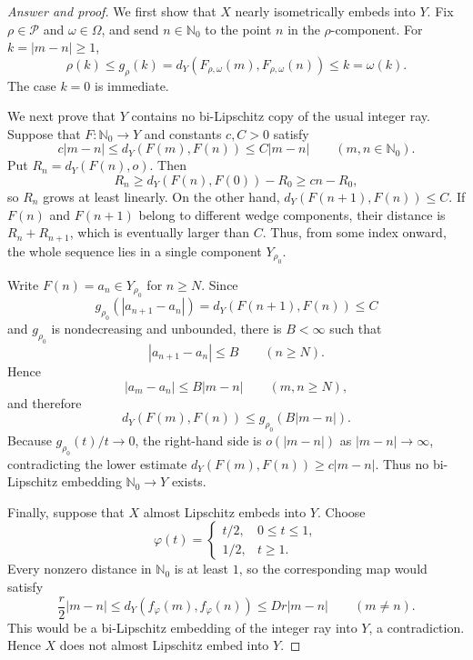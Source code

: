 \documentclass[11pt,reqno]{amsart}
\theoremstyle{plain}
\theoremstyle{definition}
\begin{document}
\begin{proof}[Answer and proof]
We first show that $X$ nearly isometrically embeds into $Y$. Fix $\rho\in\mathcal P$ and $\omega\in\Omega$, and send $n\in\mathbb N_0$ to the point $n$ in the $\rho$-component. For $k=|m-n|\geq1$,
\begin{equation*}
 \rho(k) \leq g_\rho(k) =d_Y(F_{\rho,\omega}(m),F_{\rho,\omega}(n)) \leq k =\omega(k).
\end{equation*}
The case $k=0$ is immediate.

We next prove that $Y$ contains no bi-Lipschitz copy of the usual integer ray. Suppose that $F\colon\mathbb N_0\to Y$ and constants $c,C>0$ satisfy
\begin{equation*}
 c|m-n|\leq d_Y(F(m),F(n))\leq C|m-n|
 \qquad(m,n\in\mathbb N_0).
\end{equation*}
Put $R_n=d_Y(F(n),o)$. Then
\begin{equation*}
 R_n\geq d_Y(F(n),F(0))-R_0\geq cn-R_0,
\end{equation*}
so $R_n$ grows at least linearly. On the other hand, $d_Y(F(n+1),F(n))\leq C$. If $F(n)$ and $F(n+1)$ belong to different wedge components, their distance is $R_n+R_{n+1}$, which is eventually larger than $C$. Thus, from some index onward, the whole sequence lies in a single component $Y_{\rho_0}$.

Write $F(n)=a_n\in Y_{\rho_0}$ for $n\geq N$. Since
\begin{equation*}
 g_{\rho_0}(|a_{n+1}-a_n|)=d_Y(F(n+1),F(n))\leq C
\end{equation*}
and $g_{\rho_0}$ is nondecreasing and unbounded, there is $B<\infty$ such that
\begin{equation*}
 |a_{n+1}-a_n|\leq B \qquad(n\geq N).
\end{equation*}
Hence
\begin{equation*}
 |a_m-a_n|\leq B|m-n| \qquad(m,n\geq N),
\end{equation*}
and therefore
\begin{equation*}
 d_Y(F(m),F(n))\leq g_{\rho_0}(B|m-n|).
\end{equation*}
Because $g_{\rho_0}(t)/t\to0$, the right-hand side is $o(|m-n|)$ as $|m-n|\to\infty$, contradicting the lower estimate $d_Y(F(m),F(n))\geq c|m-n|$. Thus no bi-Lipschitz embedding $\mathbb N_0\to Y$ exists.

Finally, suppose that $X$ almost Lipschitz embeds into $Y$. Choose
\begin{equation*}
 \varphi(t)=
 \begin{cases}
 t/2, & 0\leq t\leq1,\\
 1/2, & t\geq1.
 \end{cases}
\end{equation*}
Every nonzero distance in $\mathbb N_0$ is at least $1$, so the corresponding map would satisfy
\begin{equation*}
    \frac r2|m-n| \leq d_Y(f_\varphi(m),f_\varphi(n)) \leq Dr|m-n| \qquad(m\neq n).
\end{equation*}
This would be a bi-Lipschitz embedding of the integer ray into $Y$, a contradiction. Hence $X$ does not almost Lipschitz embed into $Y$.
\end{proof}
\end{document}
